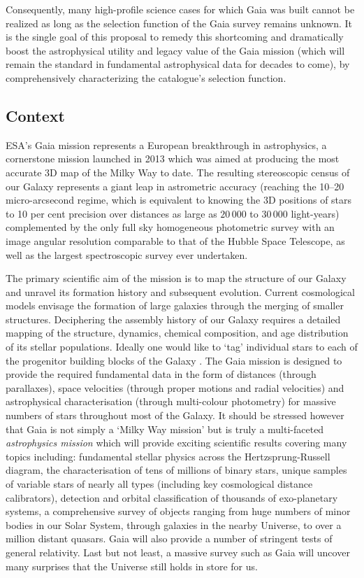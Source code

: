 Consequently, many high-profile science cases for which Gaia was built cannot be realized as long as the selection function of the Gaia survey remains unknown. It is the single goal of this proposal to remedy this shortcoming and dramatically boost the astrophysical utility and legacy value of the Gaia mission (which will remain the standard in fundamental astrophysical data for decades to come), by comprehensively characterizing the catalogue's selection function.

\subsection{Context}
\label{sec:context}

ESA's Gaia mission \cite{2016A&A...595A...1G} represents a European breakthrough in astrophysics, a cornerstone mission launched in 2013 which was aimed at producing the most accurate 3D map of the Milky Way to date. The resulting stereoscopic census of our Galaxy represents a giant leap in astrometric accuracy (reaching the 10--20 micro-arcsecond regime, which is equivalent to knowing the 3D positions of stars to 10 per cent precision over distances as large as $20\,000$ to $30\,000$ light-years) complemented by the only full sky homogeneous photometric survey with an image angular resolution comparable to that of the Hubble Space Telescope, as well as the largest spectroscopic survey ever undertaken. 

The primary scientific aim of the mission is to map the structure of our Galaxy and unravel its formation history and subsequent evolution. Current cosmological models envisage the formation of large galaxies through the merging of smaller structures. Deciphering the assembly history of our Galaxy requires a detailed mapping of the structure, dynamics, chemical composition, and age distribution of its stellar populations. Ideally one would like to `tag' individual stars to each of the progenitor building blocks of the Galaxy \cite{2002ARA&A..40..487F}. The Gaia mission is designed to provide the required fundamental data in the form of distances (through parallaxes), space velocities (through proper motions and radial velocities) and astrophysical characterisation (through multi-colour photometry) for massive numbers of stars throughout most of the Galaxy. It should be stressed however that Gaia is not simply a `Milky Way mission' but is truly a multi-faceted {\em astrophysics mission} which will provide exciting scientific results covering many topics including: fundamental stellar physics across the Hertzsprung-Russell diagram, the characterisation of tens of millions of binary stars, unique samples of variable stars of nearly all types (including key cosmological distance calibrators), detection and orbital classification of thousands of exo-planetary systems, a comprehensive survey of objects ranging from huge numbers of minor bodies in our Solar System, through galaxies in the nearby Universe, to over a million distant quasars. Gaia will also provide a number of stringent tests of general relativity. Last but not least, a massive survey such as Gaia will uncover many surprises that the Universe still holds in store for us.

